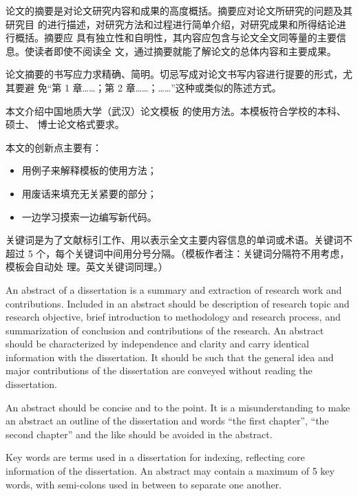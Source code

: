 \begin{cabstract}
	论文的摘要是对论文研究内容和成果的高度概括。摘要应对论文所研究的问题及其研究目
	的进行描述，对研究方法和过程进行简单介绍，对研究成果和所得结论进行概括。摘要应
	具有独立性和自明性，其内容应包含与论文全文同等量的主要信息。使读者即使不阅读全
	文，通过摘要就能了解论文的总体内容和主要成果。
	
	论文摘要的书写应力求精确、简明。切忌写成对论文书写内容进行提要的形式，尤其要避
	免“第 1 章……；第 2 章……；……”这种或类似的陈述方式。
	
	本文介绍中国地质大学（武汉）论文模板 \thuthesis{} 的使用方法。本模板符合学校的本科、硕士、
	博士论文格式要求。
	
	本文的创新点主要有：
	\begin{itemize}
		\item 用例子来解释模板的使用方法；
		\item 用废话来填充无关紧要的部分；
		\item 一边学习摸索一边编写新代码。
	\end{itemize}
	
	关键词是为了文献标引工作、用以表示全文主要内容信息的单词或术语。关键词不超过 5
	个，每个关键词中间用分号分隔。（模板作者注：关键词分隔符不用考虑，模板会自动处
	理。英文关键词同理。）
\end{cabstract}


\begin{eabstract}
	An abstract of a dissertation is a summary and extraction of research work
	and contributions. Included in an abstract should be description of research
	topic and research objective, brief introduction to methodology and research
	process, and summarization of conclusion and contributions of the
	research. An abstract should be characterized by independence and clarity and
	carry identical information with the dissertation. It should be such that the
	general idea and major contributions of the dissertation are conveyed without
	reading the dissertation.
	
	An abstract should be concise and to the point. It is a misunderstanding to
	make an abstract an outline of the dissertation and words ``the first
	chapter'', ``the second chapter'' and the like should be avoided in the
	abstract.
	
	Key words are terms used in a dissertation for indexing, reflecting core
	information of the dissertation. An abstract may contain a maximum of 5 key
	words, with semi-colons used in between to separate one another.
\end{eabstract}

